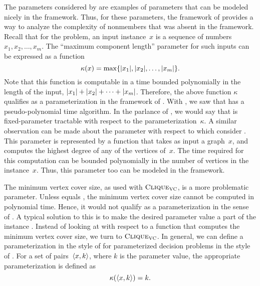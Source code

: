 The parameters considered by \citeauthor{garey1979computers} are examples of parameters that can be modeled nicely in the \citeauthor{flum2006parameterized} framework.
Thus, for these parameters, the framework of \citeauthor{flum2006parameterized} provides a way to analyze the complexity of nonmembers that was absent in the \citeauthor{downey1999parameterized} framework.
Recall that for the  problem, an input instance~$x$ is a sequence of numbers $x_1, x_2, \ldots, x_m$.
The \enquote{maximum component length} parameter for such inputs can be expressed as a function
\begin{equation*}
  \kappa(x) = \max \{{\lvert x_1\rvert}, {\lvert x_2\rvert}, \ldots, {\lvert x_m\rvert}\}.
\end{equation*}
Note that this function is computable in a time bounded polynomially in the length of the input, ${\lvert x_1\rvert} + {\lvert x_2\rvert} + \cdots + {\lvert x_m\rvert}$.
Therefore, the above function $\kappa$ qualifies as a parameterization in the framework of \citeauthor{flum2006parameterized}.
With \citeauthor{garey1979computers}, we saw that  has a pseudo-polynomial time algorithm.
In the parlance of \citeauthor{flum2006parameterized}, we would say that  is fixed-parameter tractable with respect to the parameterization~$\kappa$.
A similar observation can be made about the parameter with respect to which \citeauthor{garey1979computers} consider .
This parameter is represented by a function that takes as input a graph~$x$, and computes the highest degree of any of the vertices of~$x$.
The time required for this computation can be bounded polynomially in the number of vertices in the instance~$x$.
Thus, this parameter too can be modeled in the \citeauthor{flum2006parameterized} framework.

The minimum vertex cover size, as used with $\textnormal{\textsc{Clique}}_{\textnormal{\textsc{VC}}}$, is a more problematic parameter.
Unless  equals , the minimum vertex cover size cannot be computed in polynomial time.
Hence, it would not qualify as a parameterization in the sense of \citeauthor{flum2006parameterized}.
A typical solution to this is to make the desired parameter value a part of the instance \parencite[for instance][Section~15.2.4]{cygan2015parameterized}.
Instead of looking at  with respect to a function that computes the minimum vertex cover size, we turn to $\textnormal{\textsc{Clique}}_{\textnormal{\textsc{VC}}}$.
In general, we can define a parameterization in the style of \citeauthor{flum2006parameterized} for parameterized decision problems in the style of \citeauthor{downey1999parameterized}.
For a set of pairs~${\langle x, k\rangle}$, where $k$ is the parameter value, the appropriate parameterization is defined as
\begin{equation}
\label{eq:parameterization}
  \kappa({\langle x, k\rangle}) = k.
\end{equation}

